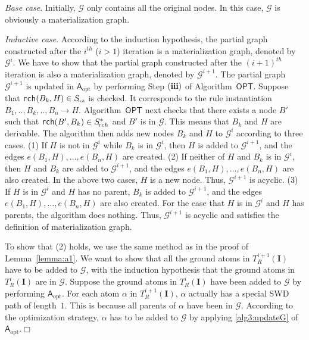 \emph{Base case}. Initially, $\mathcal{G}$ only contains all the original nodes.
In this case, $\mathcal{G}$ is obviously a materialization graph.

\emph{Inductive case}.
According to the induction hypothesis, the partial graph constructed after
the $i^{th}$ ($i>1$) iteration is a materialization graph, denoted by $\mathcal{G}^{i}$.
We have to show that the partial graph constructed after the $(i+1)^{th}$ iteration is
also a materialization graph, denoted by $\mathcal{G}^{i+1}$.
The partial graph $\mathcal{G}^{i+1}$ is updated in $\mathsf{A}_{\text{opt}}$ by performing Step $(\textbf{\romannumeral3})$
of Algorithm~$\mathsf{OPT}$.
Suppose that \texttt{rch}$(B_k,H)\in S_{\textit{\!\tiny rch}}$ is checked.
It corresponds to the rule instantiation $B_1,..,B_k,..,B_n\rightarrow H$.
Algorithm~$\mathsf{OPT}$ next checks that there exists a node $B'$ such that
\texttt{rch}$(B',B_k)\in S^*_{\!\tiny rch}$
and $B'$ is in $\mathcal{G}$. This means that $B_k$ and $H$ are derivable.
The algorithm then adds new nodes $B_k$ and $H$ to $\mathcal{G}^{i}$
according to three cases.
(1) If $H$ is not in $\mathcal{G}^{i}$ while $B_k$ is in $\mathcal{G}^{i}$,
then $H$ is added to $\mathcal{G}^{i+1}$, and the edges $e(B_1, H),\ldots ,e(B_n, H)$ are created.
(2) If neither of $H$ and $B_k$ is in $\mathcal{G}^{i}$,
then $H$ and $B_k$ are added to $\mathcal{G}^{i+1}$, and the edges $e(B_1, H),\ldots ,e(B_n, H)$ are also created.
In the above two cases, $H$ is a new node. Thus,
$\mathcal{G}^{i+1}$ is acyclic.
(3) If $H$ is in $\mathcal{G}^{i}$ and $H$ has no parent,
$B_k$ is added to $\mathcal{G}^{i+1}$, and the edges $e(B_1, H),\ldots ,e(B_n, H)$ are also created.
For the case that $H$ is in $\mathcal{G}^{i}$ and $H$ has parents,
the algorithm does nothing.
Thus, $\mathcal{G}^{i+1}$ is acyclic and satisfies the definition of materialization graph.

To show that (2) holds, we use the same method as in the proof of Lemma~\ref{lemma:a1}.
We want to show that all the ground atoms in $T_R^{i+1}(\textbf{I})$ have to be added to $\mathcal{G}$,
with the induction hypothesis that the ground atoms in $T_R^{i}(\textbf{I})$ are in $\mathcal{G}$.
Suppose the ground atoms in $T_R^{i}(\textbf{I})$ have been added to $\mathcal{G}$ by
performing $\mathsf{A}_{\text{opt}}$.
For each atom $\alpha$ in $T_R^{i+1}(\textbf{I})$, $\alpha$ actually has a special SWD path
of length~$1$. This is because all parents of $\alpha$ have been in $\mathcal{G}$.
According to the optimization strategy, $\alpha$ has to be added to $\mathcal{G}$ by applying \ref{alg3:updateG}
of $\mathsf{A}_{\text{opt}}$.\hfill$\Box$


